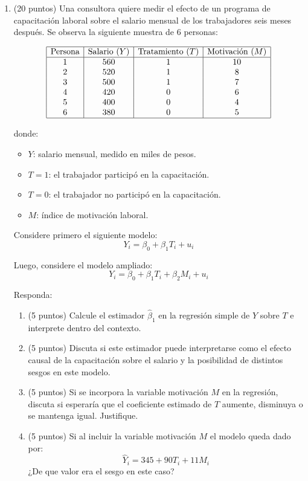 \documentclass[10pt,a4paper]{article}
\begin{document}
\begin{enumerate}
    \item (20 puntos) Una consultora quiere medir el efecto de un programa de capacitación laboral sobre el salario mensual de los trabajadores seis meses después. Se observa la siguiente muestra de 6 personas:

    \[
    \begin{array}{|c|c|c|c|}
    \hline
    \text{Persona} & \text{Salario } (Y) & \text{Tratamiento } (T) & \text{Motivación } (M)\\
    \hline
    1 & 560 & 1 & 10\\
    2 & 520 & 1 & 8\\
    3 & 500 & 1 & 7\\
    4 & 420 & 0 & 6\\
    5 & 400 & 0 & 4\\
    6 & 380 & 0 & 5 \\
    \hline
    \end{array}
    \]

    donde:
    \begin{itemize}
        \item \(Y\): salario mensual, medido en miles de pesos.
        \item \(T=1\): el trabajador participó en la capacitación.
        \item \(T=0\): el trabajador no participó en la capacitación.
        \item \(M\): índice de motivación laboral.
    \end{itemize}

    Considere primero el siguiente modelo:
    \[
    Y_i=\beta_0+\beta_1 T_i+u_i
    \]

    Luego, considere el modelo ampliado:
    \[
    Y_i=\beta_0+\beta_1 T_i+\beta_2 M_i+u_i
    \]

    Responda:

    \begin{enumerate}
        \item (5 puntos) Calcule el estimador \(\hat{\beta}_1\) en la regresión simple de \(Y\) sobre \(T\) e interprete dentro del contexto.
        \item (5 puntos) Discuta si este estimador puede interpretarse como el efecto causal de la capacitación sobre el salario y la posibilidad de distintos sesgos en este modelo.
        \item (5 puntos) Si se incorpora la variable motivación \(M\) en la regresión, discuta si esperaría que el coeficiente estimado de \(T\) aumente, disminuya o se mantenga igual. Justifique.
        \item (5 puntos) Si al incluir la variable motivación \(M\) el modelo queda dado por:
        $$\hat{Y}_i = 345 + 90T_i + 11M_i$$
        ¿De que valor era el sesgo en este caso?
    \end{enumerate}




\end{enumerate}
\end{document}
